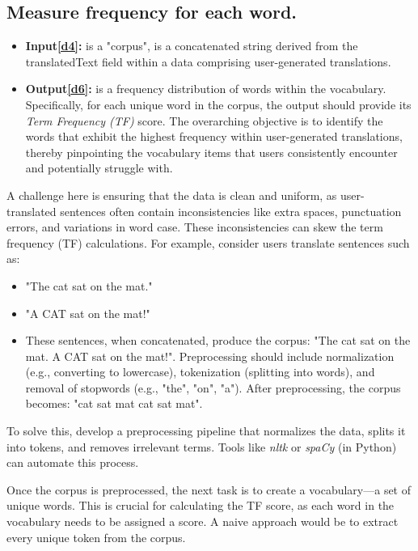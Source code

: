 \documentclass{article}
\begin{document}
\subsection{Measure frequency for each word.}
\begin{itemize}
    \item \textbf{Input\hyperref[sec:input4]{[d4]}:} is a "corpus", is a concatenated string derived from the translatedText field within a data comprising user-generated translations. 
    \label{sec:input6}
    \item \textbf{Output\hyperref[sec:input6]{[d6]}:} is a frequency distribution of words within the vocabulary. Specifically, for each unique word in the corpus, the output should provide its \textit{Term Frequency (TF)} score. The overarching objective is to identify the words that exhibit the highest frequency within user-generated translations, thereby pinpointing the vocabulary items that users consistently encounter and potentially struggle with.
\end{itemize}

A challenge here is ensuring that the data is clean and uniform, as user-translated sentences often contain inconsistencies like extra spaces, punctuation errors, and variations in word case. These inconsistencies can skew the term frequency (TF) calculations. 
For example, consider users translate sentences such as:
\begin{itemize}
    \item "The cat sat on the mat."
    \item "A CAT sat on the mat!"
    \item These sentences, when concatenated, produce the corpus: "The cat sat on the mat. A CAT sat on the mat!". Preprocessing should include normalization (e.g., converting to lowercase), tokenization (splitting into words), and removal of stopwords (e.g., "the", "on", "a"). After preprocessing, the corpus becomes: "cat sat mat cat sat mat".
\end{itemize}
To solve this, develop a preprocessing pipeline that normalizes the data, splits it into tokens, and removes irrelevant terms. Tools like \textit{nltk} or \textit{spaCy} (in Python) can automate this process.

Once the corpus is preprocessed, the next task is to create a vocabulary—a set of unique words. This is crucial for calculating the TF score, as each word in the vocabulary needs to be assigned a score. A naive approach would be to extract every unique token from the corpus. 
\end{document}
